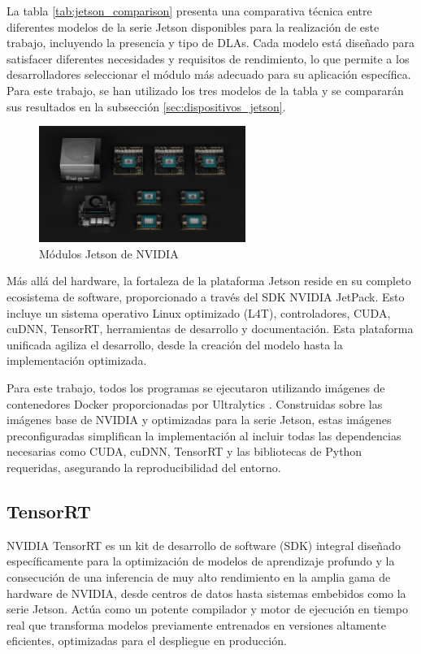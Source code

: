 \documentclass[11pt,spanish,listoffigures,listoftables]{tfgetsinf}
\begin{document}
La tabla \ref{tab:jetson_comparison}\cite{nvidia_jetson_modules} presenta una comparativa técnica entre diferentes modelos de la serie Jetson disponibles para la realización de este trabajo, incluyendo la presencia y tipo de DLAs. Cada modelo está diseñado para satisfacer diferentes necesidades y requisitos de rendimiento, lo que permite a los desarrolladores seleccionar el módulo más adecuado para su aplicación específica. Para este trabajo, se han utilizado los tres modelos de la tabla y se compararán sus resultados en la subsección \ref{sec:dispositivos_jetson}.


\begin{figure}[H]
   \centering
   \includegraphics[width=0.6\textwidth]{images/estado_del_arte/jetson_family.png}
   \caption[Módulos Jetson de NVIDIA]{Módulos Jetson de NVIDIA}
   \label{fig:jetson_modules}
\end{figure}


Más allá del hardware, la fortaleza de la plataforma Jetson reside en su completo ecosistema de software, proporcionado a través del SDK NVIDIA JetPack. Esto incluye un sistema operativo Linux optimizado (L4T), controladores, CUDA, cuDNN, TensorRT, herramientas de desarrollo y documentación. Esta plataforma unificada agiliza el desarrollo, desde la creación del modelo hasta la implementación optimizada.

Para este trabajo, todos los programas se ejecutaron utilizando imágenes de contenedores Docker proporcionadas por Ultralytics \cite{ultralytics_docker_quickstart}. Construidas sobre las imágenes base de NVIDIA y optimizadas para la serie Jetson, estas imágenes preconfiguradas simplifican la implementación al incluir todas las dependencias necesarias como CUDA, cuDNN, TensorRT y las bibliotecas de Python requeridas, asegurando la reproducibilidad del entorno.

\subsection{TensorRT} \label{sec:tensorrt}
NVIDIA TensorRT es un kit de desarrollo de software (SDK) integral diseñado específicamente para la optimización de modelos de aprendizaje profundo y la consecución de una inferencia de muy alto rendimiento en la amplia gama de hardware de NVIDIA, desde centros de datos hasta sistemas embebidos como la serie Jetson. Actúa como un potente compilador y motor de ejecución en tiempo real que transforma modelos previamente entrenados en versiones altamente eficientes, optimizadas para el despliegue en producción.
\end{document}
